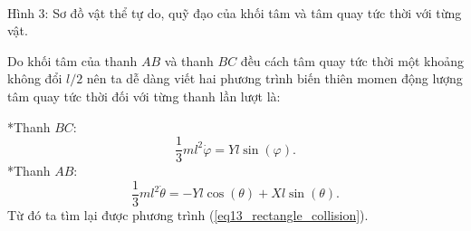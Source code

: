 \begin{enumerate}
\begin{center}
\begin{minipage}{0.4\textwidth}
\end{minipage}
\\ \vspace{0.5cm} 
Hình 3: Sơ đồ vật thể tự do, quỹ đạo của khối tâm và tâm quay tức thời với từng vật.
\end{center}

Do khối tâm của thanh $AB$ và thanh $BC$ đều cách tâm quay tức thời một khoảng không đổi $l/2$ nên ta dễ dàng viết hai phương trình biến thiên momen động lượng tâm quay tức thời đối với từng thanh lần lượt là:

*Thanh $BC$:
\begin{equation} \label{eq16_rectangle_collision}
    \dfrac{1}{3} m l^2 \dot{\varphi} = Y l \sin(\varphi).
\end{equation}
*Thanh $AB$:
\begin{equation} \label{eq17_rectangle_collision}
    \dfrac{1}{3} m l^2 \dot{\theta} = -Y l \cos(\theta) + X l \sin (\theta).
\end{equation}
Từ đó ta tìm lại được phương trình (\ref{eq13_rectangle_collision}).


\end{enumerate}

